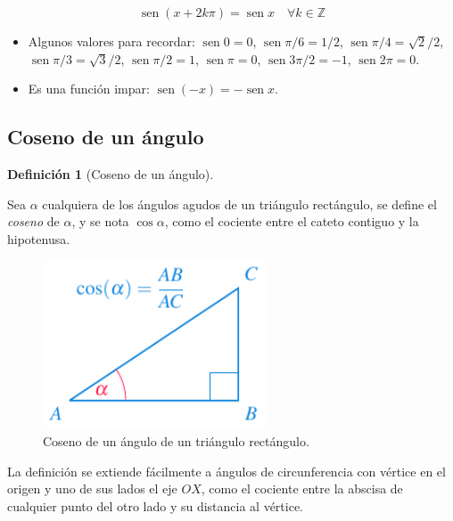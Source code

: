 \documentclass[
  a4paper,
]{scrreport}
\providecommand{\tightlist}{%
  \setlength{\itemsep}{0pt}\setlength{\parskip}{0pt}}\usepackage{longtable,booktabs,array}
\theoremstyle{definition}
\theoremstyle{plain}
\theoremstyle{definition}
\newtheorem{definition}{Definición}[chapter]
\theoremstyle{definition}
\theoremstyle{plain}
\theoremstyle{plain}
\theoremstyle{remark}
\begin{document}
\[\operatorname{sen} (x+2k\pi)= \operatorname{sen} x\quad \forall k\in \mathbb{Z}\]

\begin{itemize}
\tightlist
\item
  Algunos valores para recordar: \(\operatorname{sen} 0=0\),
  \(\operatorname{sen} \pi/6= 1/2\),
  \(\operatorname{sen} \pi/4=\sqrt{2}/2\),
  \(\operatorname{sen} \pi/3= \sqrt{3}/2\),
  \(\operatorname{sen} \pi/2 =1\), \(\operatorname{sen} \pi = 0\),
  \(\operatorname{sen} 3\pi/2=-1\), \(\operatorname{sen} 2\pi=0\).
\item
  Es una función impar:
  \(\operatorname{sen}(-x)=-\operatorname{sen} x\).
\end{itemize}

\subsection{Coseno de un ángulo}\label{coseno-de-un-uxe1ngulo}

\begin{definition}[Coseno de un
ángulo]\protect\hypertarget{def-coseno-angulo}{}\label{def-coseno-angulo}

Sea \(\alpha\) cualquiera de los ángulos agudos de un triángulo
rectángulo, se define el \emph{coseno} de \(\alpha\), y se nota
\(\cos \alpha\), como el cociente entre el cateto contiguo y la
hipotenusa.

\end{definition}

\begin{figure}[H]

{\centering \includegraphics[width=2.60417in,height=\textheight]{./img/funciones/coseno-triangulo.pdf}

}

\caption{Coseno de un ángulo de un triángulo rectángulo.}

\end{figure}%

La definición se extiende fácilmente a ángulos de circunferencia con
vértice en el origen y uno de sus lados el eje \(OX\), como el cociente
entre la abscisa de cualquier punto del otro lado y su distancia al
vértice.
\end{document}
